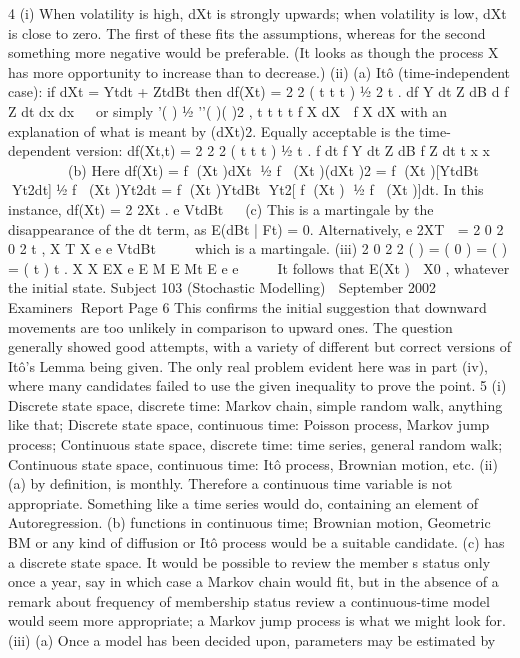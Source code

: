 \documentclass[a4paper,12pt]{article}
\begin{document}
\begin{enumerate}
4 (i) When volatility is high, dXt is strongly upwards; when volatility is low, dXt is
close to zero.
The first of these fits the assumptions, whereas for the second something more
negative would be preferable. (It looks as though the process X has more
opportunity to increase than to decrease.)
(ii) (a) Itô (time-independent case): if dXt = Ytdt + ZtdBt then
df(Xt) =
2
2
( t t t ) ½ 2 t .
df Y dt Z dB d f Z dt
dx dx
  or simply
’( ) ½ ’’( )( )2 , t t t t f X dX  f X dX with an explanation of what is meant by (dXt)2.
Equally acceptable is the time-dependent version:
df(Xt,t) =
2
2
2 ( t t t ) ½ t .
f dt f Y dt Z dB f Z dt
t x x
  
  
  
(b) Here
df(Xt) = f (Xt )dXt ½ f (Xt )(dXt )2
= f (Xt )[YtdBt Yt2dt]½ f (Xt )Yt2dt
= f (Xt )YtdBt Yt2[ f (Xt ) ½ f (Xt )]dt.
In this instance, df(Xt) = 2 2Xt .
e VtdBt 

(c) This is a martingale by the disappearance of the dt term, as E(dBt | Ft) = 0.
Alternatively,
e 2XT  = 2 0 2
0
2 t ,
X T X
e e VtdBt  
 
which is a martingale.
(iii) 2 0 2 2 ( )
= ( 0 ) = ( ) = ( t ) t . X X EX
e E M E Mt E e e     It follows that E(Xt )  X0 ,
whatever the initial state.
Subject 103 (Stochastic Modelling)  September 2002  Examiners Report
Page 6
This confirms the initial suggestion that downward movements are too
unlikely in comparison to upward ones.
The question generally showed good attempts, with a variety of different but correct versions
of Itô’s Lemma being given. The only real problem evident here was in part (iv), where many
candidates failed to use the given inequality to prove the point.
5 (i) Discrete state space, discrete time: Markov chain, simple random walk,
anything like that;
Discrete state space, continuous time: Poisson process, Markov jump process;
Continuous state space, discrete time: time series, general random walk;
Continuous state space, continuous time: Itô process, Brownian motion, etc.
(ii) (a) by definition, is monthly. Therefore a continuous time variable is not
appropriate. Something like a time series would do, containing an element of
Autoregression.
(b) functions in continuous time; Brownian motion, Geometric BM or any
kind of diffusion or Itô process would be a suitable candidate.
(c) has a discrete state space. It would be possible to review the members
status only once a year, say in which case a Markov chain would fit, but in the
absence of a remark about frequency of membership status review a
continuous-time model would seem more appropriate; a Markov jump process
is what we might look for.
(iii) (a) Once a model has been decided upon, parameters may be estimated by

\end{enumerate}
\end{document}
